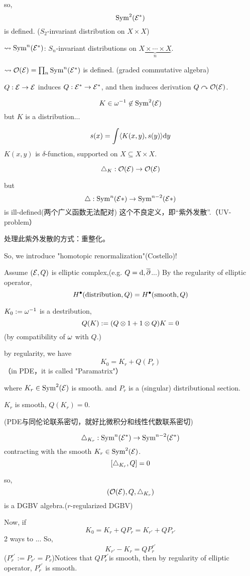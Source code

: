 so,
$$\operatorname{Sym}^2(\mathcal{E}^*)$$
is defined.
($S_2$-invariant distribution on $X\times X$)

$\rightsquigarrow\operatorname{Sym}^n(\mathcal{E}^*)$: $S_n$-invariant distributions on
$\underbrace{X\times\cdots\times X}_n$.

$\rightsquigarrow\mathcal{O}(\mathcal{E})=\prod_n\operatorname{Sym}^n(\mathcal{E}^*)$ is defined.
(graded commutative algebra)

$Q:\mathcal{E}\to\mathcal{E}$ induces $Q:\mathcal{E}^*\to\mathcal{E}^*$, and then
induces derivation $Q\curvearrowright\mathcal{O}(\mathcal{E})$.

$$K\in\omega^{-1}\not\in\operatorname{Sym}^2(\mathcal{E})$$
but $K$ is a distribution...

$$s(x)=\int\langle K(x,y),s(y)\rangle\mathrm{d} y$$
$K(x,y)$ is $\delta$-function, supported on $X\subseteq X\times X$.

$$\triangle_K:\mathcal{O}(\mathcal{E})\to\mathcal{O}(\mathcal{E})$$

but
$$\triangle:\operatorname{Sym}^n(\mathcal{E}*)\to\operatorname{Sym}^{n-2}(\mathcal{E}*)$$
is ill-defined(两个广义函数无法配对)
这个不良定义，即“紫外发散”.（UV-problem）

处理此紫外发散的方式：重整化。

So, we introduce "homotopic renormalization"(Costello)!

Assume $(\mathcal{E},Q)$ is elliptic complex,(e.g. $Q=\mathrm{d},\overline{\partial}$...)
By the regularity of elliptic operator,
$$H^{\bullet}(\text{distribution},Q)=H^{\bullet}(\text{smooth},Q)$$

$K_0:=\omega^{-1}$ is a destribution,
$$Q(K):=(Q\otimes 1+ 1\otimes Q)K=0$$
(by compatibility of $\omega$ with $Q$.)

by regularity, we have
$$K_0=K_r+Q(P_r)$$
（in PDE，it is called "Paramatrix"）

where $K_r\in\operatorname{Sym}^2(\mathcal{E})$ is smooth.
and $P_r$ is a (singular) distributional section.

$K_r$ is smooth, $Q(K_r)=0$.

{\color{blue}
(PDE与同伦论联系密切，就好比微积分和线性代数联系密切)
}

$$\triangle_{K_r}:\operatorname{Sym}^n(\mathcal{E}^*)\to\operatorname{Sym}^{n-2}(\mathcal{E}^*)$$
contracting with the smooth $K_r\in\operatorname{Sym}^2(\mathcal{E})$.
$$[\triangle_{K_r},Q]=0$$

so,
$$(\mathcal{O}(\mathcal{E}),Q,\triangle_{K_r})$$
is a DGBV algebra.($r$-regularized DGBV)

Now, if
$$K_0=K_r+QP_r=K_{r'}+QP_{r'}$$
2 ways to ...
So,
$$K_{r'}-K_r=QP^{r'}_r$$
($P_r^{r'}:=P_{r'}=P_r$)Notices that
$QP^{r'}_r$is smooth, then by regularity of elliptic operator,
$P^{r'}_r$ is smooth.

